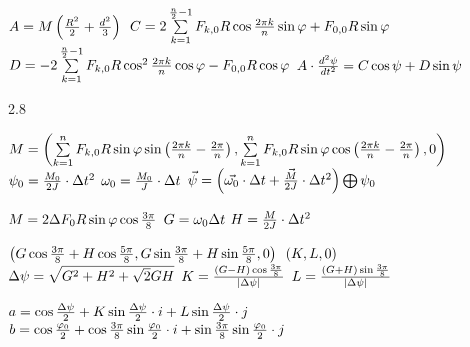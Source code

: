 \documentclass{article}
\begin{document}
$A=M\left ( \frac{R^2}{2}+\frac{d^2}{3} \right ) \\$
$C=2\sum\limits_{k=1}^{\frac{n}{2}-1}F_{k,0}R\cos\frac{2\pi k}{n}\sin\varphi 
	+ F_{0,0} R\sin\varphi
 \\ $
$D=-2\sum\limits_{k=1}^{\frac{n}{2}-1}F_{k,0} R\cos^2\frac{2\pi k}{n}\cos\varphi
	-F_{0,0} R\cos\varphi
\\$
$A\cdot \frac{d^{2}\psi }{dt^{2} }=C\cos\psi+D\sin \psi
\\$


2.8


$M= \left ( 
	\sum\limits_{k=1}^{n}F_{k,0} R \sin\varphi \sin \left ( \frac{2\pi k}{n}-\frac{2\pi}{n} \right ) ,
	\sum\limits_{k=1}^{n}F_{k,0} R \sin\varphi \cos \left ( \frac{2\pi k}{n}-\frac{2\pi}{n} \right ) ,
	0 \right )
\\ $
$\psi_0 = \frac{M_0}{2J}\cdot \Delta t^2
\\$
$\omega_0  = \frac{M_0}{J}\cdot \Delta t
\\$
$
\vec{\psi} = \left ( 
	\vec{\omega_0}\cdot \Delta t + \vec{\frac{M}{2J}}\cdot \Delta t^2
	\right ) \bigoplus \psi_0 
\\$

$M  = 2 \Delta F_0 R \sin\varphi \cos \frac{3\pi}{8}
\\$
$G  = \omega_0 \Delta t
\\$
$H  = \frac{M}{2J}\cdot \Delta t^2
\\$


$\left ( 
	G \cos \frac{3\pi}{8}+H \cos \frac{5\pi}{8},
	G \sin \frac{3\pi}{8}+H \sin \frac{5\pi}{8},0
\right )
\\$
$ \left ( K,L,0 \right )
\\$
$ \Delta \psi  = \sqrt{G^2+H^2+\sqrt2 GH}
\\$
$K  =  \frac {\left ( G-H \right ) \cos \frac{3\pi}{8} }{\left | \Delta\psi \right | }
\\$
$L  =  \frac {\left ( G+H \right ) \sin \frac{3\pi}{8} }{\left | \Delta\psi \right | }
\\$


$ a = \cos\frac {\Delta \psi}{2} 
		+K \sin\frac {\Delta \psi}{2} \cdot i 
		+L \sin\frac {\Delta \psi}{2} \cdot j
\\$
$ b = \cos\frac {\varphi_0}{2} 
		+\cos \frac{3\pi}{8} \sin\frac {\varphi_0}{2} \cdot i 
		+\sin \frac{3\pi}{8} \sin\frac {\varphi_0}{2} \cdot j
\\$
\end{document}
